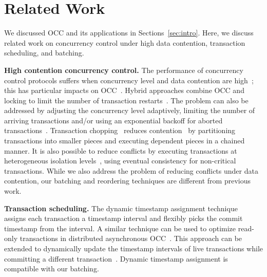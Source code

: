 \section{Related Work}\label{sec:relwork}

We discussed OCC and its applications in Sections~\ref{sec:intro}. 
Here, we discuss related work on concurrency control under high data contention, transaction scheduling, and batching. 

{\bf High contention concurrency control.}
The performance of concurrency control protocols suffers when concurrency level and data contention are high~\cite{franaszek1985limitations}; this has particular impacts on OCC~\cite{agrawal1987concurrency}. Hybrid approaches combine OCC and locking to limit the number of transaction restarts~\cite{thomasian1998distributed,yu1992analysis}. The problem can also be addressed by adjusting the concurrency level adaptively, limiting the number of arriving transactions and/or using an exponential backoff for aborted transactions~\cite{helal1993adaptive}. Transaction chopping~\cite{shasha1995transaction} reduces contention~\cite{mu2014extracting,xie2015high} by partitioning transactions into smaller pieces and executing dependent pieces in a chained manner. It is also possible to reduce conflicts by executing transactions at heterogeneous isolation levels~\cite{xie2014salt,xie2015high}, using eventual consistency for non-critical transactions. While we also address the problem of reducing conflicts under data contention, our batching and reordering techniques are different from previous work.

{\bf Transaction scheduling.}
The dynamic timestamp assignment technique~\cite{bayer1982dynamic} assigns each transaction a timestamp interval and flexibly picks the commit timestamp from the interval. A similar technique can be used to optimize read-only transactions in distributed asynchronous OCC~\cite{ding2015centiman}. This approach can be extended to dynamically update the timestamp intervals of live transactions while committing a different transaction~\cite{boksenbaum1987concurrent}. Dynamic timestamp assignment is compatible with our batching.

